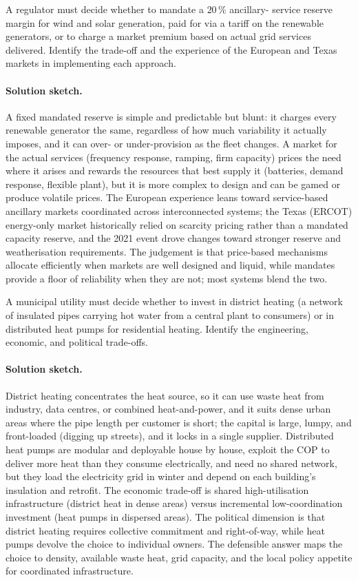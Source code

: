 \begin{exercise}
A regulator must decide whether to mandate a $20\,\%$ ancillary-
service reserve margin for wind and solar generation, paid for via a
tariff on the renewable generators, or to charge a market premium
based on actual grid services delivered. Identify the trade-off and
the experience of the European and Texas markets in implementing
each approach.
\paragraph{Solution sketch.}
A fixed mandated reserve is simple and predictable but blunt: it
charges every renewable generator the same, regardless of how much
variability it actually imposes, and it can over- or under-provision as
the fleet changes. A market for the actual services (frequency
response, ramping, firm capacity) prices the need where it arises and
rewards the resources that best supply it (batteries, demand response,
flexible plant), but it is more complex to design and can be gamed or
produce volatile prices. The European experience leans toward
service-based ancillary markets coordinated across interconnected
systems; the Texas (ERCOT) energy-only market historically relied on
scarcity pricing rather than a mandated capacity reserve, and the 2021
event drove changes toward stronger reserve and weatherisation
requirements. The judgement is that price-based mechanisms allocate
efficiently when markets are well designed and liquid, while mandates
provide a floor of reliability when they are not; most systems blend
the two.
\end{exercise}

\begin{exercise}
A municipal utility must decide whether to invest in district
heating (a network of insulated pipes carrying hot water from a
central plant to consumers) or in distributed heat pumps for
residential heating. Identify the engineering, economic, and
political trade-offs.
\paragraph{Solution sketch.}
District heating concentrates the heat source, so it can use waste heat
from industry, data centres, or combined heat-and-power, and it suits
dense urban areas where the pipe length per customer is short; the
capital is large, lumpy, and front-loaded (digging up streets), and it
locks in a single supplier. Distributed heat pumps are modular and
deployable house by house, exploit the COP to deliver more heat than
they consume electrically, and need no shared network, but they load
the electricity grid in winter and depend on each building's
insulation and retrofit. The economic trade-off is shared
high-utilisation infrastructure (district heat in dense areas) versus
incremental low-coordination investment (heat pumps in dispersed
areas). The political dimension is that district heating requires
collective commitment and right-of-way, while heat pumps devolve the
choice to individual owners. The defensible answer maps the choice to
density, available waste heat, grid capacity, and the local policy
appetite for coordinated infrastructure.
\end{exercise}


